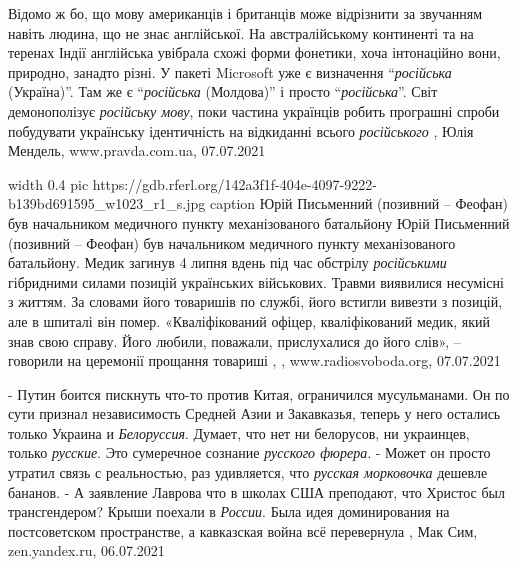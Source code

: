 Відомо ж бо, що мову американців і британців може відрізнити за звучанням
навіть людина, що не знає англійської. На австралійському континенті та на
теренах Індії англійська увібрала схожі форми фонетики, хоча інтонаційно вони,
природно, занадто різні.  У пакеті Microsoft уже є визначення \enquote{\emph{російська}
(Україна)}. Там же є \enquote{\emph{російська} (Молдова)} і просто \enquote{\emph{російська}}.
Світ демонополізує \emph{російську мову}, поки частина українців робить
програшні спроби побудувати українську ідентичність на відкиданні всього
\emph{російського}
, 
Юлія Мендель, www.pravda.com.ua, 07.07.2021

\ifcmt
	width 0.4
  pic https://gdb.rferl.org/142a3f1f-404e-4097-9222-b139bd691595_w1023_r1_s.jpg
	caption Юрій Письменний (позивний – Феофан) був начальником медичного пункту механізованого батальйону
\fi
Юрій Письменний (позивний – Феофан) був начальником медичного пункту
механізованого батальйону.  Медик загинув 4 липня вдень під час обстрілу
\emph{російськими} гібридними силами позицій українських військових. Травми виявилися
несумісні з життям. За словами його товаришів по службі, його встигли вивезти з
позицій, але в шпиталі він помер.  «Кваліфікований офіцер, кваліфікований
медик, який знав свою справу. Його любили, поважали, прислухалися до його
слів», – говорили на церемонії прощання товариші
, 
, www.radiosvoboda.org, 07.07.2021

- Путин боится пискнуть что-то против Китая, ограничился мусульманами. Он по
сути признал независимость Средней Азии и Закавказья, теперь у него остались
только Украина и \emph{Белоруссия}. Думает, что нет ни белорусов, ни украинцев, только
\emph{русские}. Это сумеречное сознание \emph{русского фюрера}.
- Может он просто утратил связь с реальностью, раз удивляется, что \emph{русская морковочка} дешевле бананов.
- А заявление Лаврова что в школах США преподают, что Христос был
трансгендером? Крыши поехали в \emph{России}. Была идея доминирования на
постсоветском пространстве, а кавказская война всё перевернула
, 
Мак Сим, zen.yandex.ru, 06.07.2021

